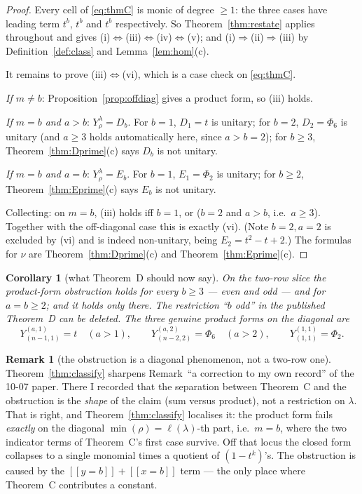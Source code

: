 \documentclass[11pt]{article}
\newtheorem{corollary}[theorem]{Corollary}
\theoremstyle{definition}
\newtheorem{remark}[theorem]{Remark}
\newcommand{\lam}{\lambda}
\newcommand{\lb}{[\![}
\newcommand{\rb}{]\!]}
\begin{document}
\begin{proof}
Every cell of \eqref{eq:thmC} is monic of degree $\ge1$: the three cases have leading term
$t^{b}$, $t^{b}$ and $t^{b}$ respectively. So Theorem~\ref{thm:restate} applies throughout and
gives (i)$\Leftrightarrow$(iii)$\Leftrightarrow$(iv)$\Leftrightarrow$(v); and
(i)$\Rightarrow$(ii)$\Rightarrow$(iii) by Definition~\ref{def:class} and
Lemma~\ref{lem:hom}(c).

It remains to prove (iii)$\Leftrightarrow$(vi), which is a case check on \eqref{eq:thmC}.

\emph{If $m\ne b$}: Proposition~\ref{prop:offdiag} gives a product form, so (iii) holds.

\emph{If $m=b$ and $a>b$}: $Y^\lam_\rho=D_b$. For $b=1$, $D_1=t$ is unitary; for $b=2$,
$D_2=\Phi_6$ is unitary (and $a\ge3$ holds automatically here, since $a>b=2$); for $b\ge3$,
Theorem~\ref{thm:Dprime}(c) says $D_b$ is not unitary.

\emph{If $m=b$ and $a=b$}: $Y^\lam_\rho=E_b$. For $b=1$, $E_1=\Phi_2$ is unitary; for $b\ge2$,
Theorem~\ref{thm:Eprime}(c) says $E_b$ is not unitary.

Collecting: on $m=b$, (iii) holds iff $b=1$, or ($b=2$ and $a>b$, i.e.\ $a\ge3$). Together with
the off-diagonal case this is exactly (vi). (Note $b=2,a=2$ is excluded by (vi) and is indeed
non-unitary, being $E_2=t^2-t+2$.) The formulas for $\nu$ are
Theorem~\ref{thm:Dprime}(c) and Theorem~\ref{thm:Eprime}(c).
\end{proof}

\begin{corollary}[what Theorem~D should now say]\label{cor:newD}
On the two-row slice the product-form obstruction holds for every $b\ge3$ --- even and odd --- and
for $a=b\ge2$; and it holds \emph{only} there. The restriction ``$b$ odd'' in the published
Theorem~D can be deleted. The three genuine product forms on the diagonal are
\[
  Y^{(a,1)}_{(n-1,1)}=t \quad (a>1),\qquad
  Y^{(a,2)}_{(n-2,2)}=\Phi_6 \quad (a>2),\qquad
  Y^{(1,1)}_{(1,1)}=\Phi_2 .
\]
\end{corollary}

\begin{remark}[the obstruction is a diagonal phenomenon, not a two-row one]
Theorem~\ref{thm:classify} sharpens Remark~``a correction to my own record'' of the 10-07 paper.
There I recorded that the separation between Theorem~C and the obstruction is the \emph{shape} of
the claim (sum versus product), not a restriction on $\lam$. That is right, and
Theorem~\ref{thm:classify} localises it: the product form fails \emph{exactly} on the diagonal
$\min(\rho)=\ell(\lam)$-th part, i.e.\ $m=b$, where the two indicator terms of Theorem~C's first
case survive. Off that locus the closed form collapses to a single monomial times a quotient of
$(1-t^{k})$'s. The obstruction is caused by the $\lb y=b\rb+\lb x=b\rb$ term --- the only place
where Theorem~C contributes a constant.
\end{remark}
\end{document}
